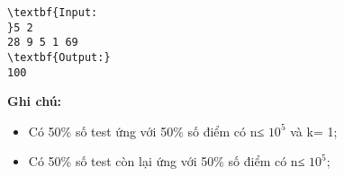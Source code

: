 \begin{verbatim}
\textbf{Input:
}5 2
28 9 5 1 69
\textbf{Output:}
100
\end{verbatim}

\textbf{Ghi chú:}
\begin{itemize}
	\item Có 50\% số test ứng với 50\% số điểm có n≤ $10^{5}$ và k= 1;
	\item Có 50\% số test còn lại ứng với 50\% số điểm có n≤ $10^{5}$;
\end{itemize}